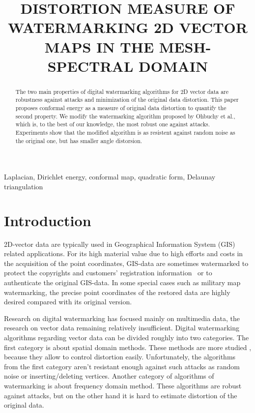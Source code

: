 \documentclass{article}
\title{DISTORTION MEASURE OF WATERMARKING 2D VECTOR MAPS IN THE MESH-SPECTRAL DOMAIN}
\begin{document}
\maketitle
\begin{abstract}
The two main properties of digital watermarking algorithms for 2D vector data are robustness against attacks and minimization of the original data distortion. 
This paper proposes conformal energy as a measure of original data distortion to quantify the second property. 
We modify the watermarking algorithm proposed by Ohbuchy et al., which is, to the best of our knowledge, the most robust one against attacks. 
Experiments show that the modified algorithm is as resistent against random noise as the original one, but has smaller angle distorsion.
\end{abstract}
%
\begin{keywords}
Laplacian, Dirichlet energy, conformal map, quadratic form, Delaunay triangulation
\end{keywords}
%
\section{Introduction}
\label{sec:intro}
2D-vector data are typically used in Geographical Information System (GIS) related applications. For its high material value due to high efforts and costs 
in the acquisition of the point coordinates, GIS-data are sometimes watermarked to protect the copyrights and customers’ registration information~\cite{Voight} 
or to authenticate the original GIS-data. In some special cases such as military map watermarking, the precise point coordinates of the restored data 
are highly desired compared with its original version.  

Research on digital watermarking has focused mainly on multimedia data, the research on vector data remaining relatively insufficient. 
Digital watermarking algorithms regarding vector data can be divided roughly into two categories. 
The first category is about spatial domain methods. These methods are more studied \cite{Voight, Kim, Chang, Bazin}, 
because they allow to control distortion easily. Unfortunately, the algorithms from the first category 
aren't resistant enough against such attacks as random noise or inserting/deleting vertices.
Another category of algorithms of watermarking is about frequency domain method. These algorithms \cite{Ohbuchi, Ohbuchi3D, Praun} are robust against attacks, 
but on the other hand it is hard to estimate distortion of the original data.
 
\end{document}
